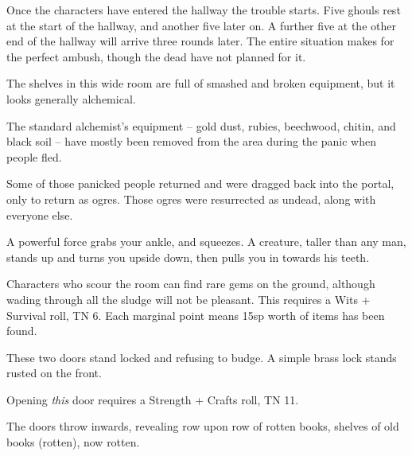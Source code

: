 \begin{multicols}{2}
Once the characters have entered the hallway the trouble starts.  Five ghouls rest at the start of the hallway, and another five later on.  A further five at the other end of the hallway will arrive three rounds later.
The entire situation makes for the perfect ambush, though the dead have not planned for it.



\begin{boxtext}

	The shelves in this wide room are full of smashed and broken equipment, but it looks generally alchemical.

\end{boxtext}

The standard alchemist's equipment -- gold dust, rubies, beechwood, chitin, and black soil -- have mostly been removed from the area during the panic when people fled.

Some of those panicked people returned and were dragged back into the portal, only to return as ogres.  Those ogres were resurrected as undead, along with everyone else.

\begin{boxtext}

	A powerful force grabs your ankle, and squeezes.
	A creature, taller than any man, stands up and turns you upside down, then pulls you in towards his teeth.

\end{boxtext}



Characters who scour the room can find rare gems on the ground, although wading through all the sludge will not be pleasant.
This requires a Wits + Survival roll, TN 6.
Each marginal point means 15sp worth of items has been found.


\begin{boxtext}

	These two doors stand locked and refusing to budge.  A simple brass lock stands rusted on the front.

\end{boxtext}

Opening \emph{this} door requires a Strength + Crafts roll, TN 11.

\begin{boxtext}
	The doors throw inwards, revealing row upon row of rotten books, shelves of old books (rotten), now rotten.
\end{boxtext}


\end{multicols}
